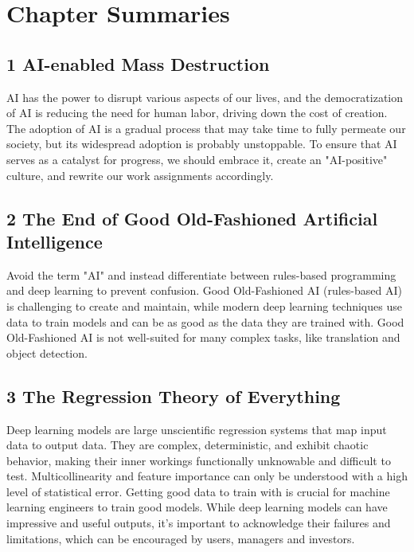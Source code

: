 \chapter*{Chapter Summaries}

\section*{1 AI-enabled Mass Destruction}

AI has the power to disrupt various aspects of our lives, and the democratization of AI is reducing the need for human labor, driving down the cost of creation. The adoption of AI is a gradual process that may take time to fully permeate our society, but its widespread adoption is probably unstoppable. To ensure that AI serves as a catalyst for progress, we should embrace it, create an "AI-positive" culture, and rewrite our work assignments accordingly.

\section*{2 The End of Good Old-Fashioned Artificial Intelligence}

Avoid the term "AI" and instead differentiate between rules-based programming and deep learning to prevent confusion. Good Old-Fashioned AI (rules-based AI) is challenging to create and maintain, while modern deep learning techniques use data to train models and can be as good as the data they are trained with. Good Old-Fashioned AI is not well-suited for many complex tasks, like translation and object detection.

\section*{3 The Regression Theory of Everything}

Deep learning models are large unscientific regression systems that map input data to output data. They are complex, deterministic, and exhibit chaotic behavior, making their inner workings functionally unknowable and difficult to test. Multicollinearity and feature importance can only be understood with a high level of statistical error. Getting good data to train with is crucial for machine learning engineers to train good models. While deep learning models can have impressive and useful outputs, it’s important to acknowledge their failures and limitations, which can be encouraged by users, managers and investors.

